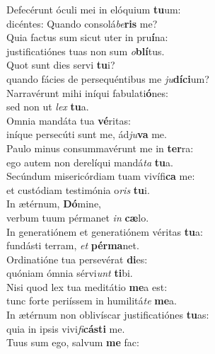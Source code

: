 \evenverse Defecérunt óculi mei in elóquium \textbf{tu}um:~\*\\
\evenverse dicéntes: Quando consolá\textit{be}\textbf{ris} me?\\
\oddverse Quia factus sum sicut uter in pru\textbf{í}na:~\*\\
\oddverse justificatiónes tuas non sum \textit{o}\textbf{blí}tus.\\
\evenverse Quot sunt dies servi \textbf{tu}i?~\*\\
\evenverse quando fácies de persequéntibus me \textit{ju}\textbf{dí}\textbf{ci}um?\\
\oddverse Narravérunt mihi iníqui fabulati\textbf{ó}nes:~\*\\
\oddverse sed non ut \textit{lex} \textbf{tu}a.\\
\evenverse Omnia mandáta tua \textbf{vé}ritas:~\*\\
\evenverse iníque persecúti sunt me, ád\textit{ju}\textbf{va} me.\\
\oddverse Paulo minus consummavérunt me in \textbf{ter}ra:~\*\\
\oddverse ego autem non derelíqui mandá\textit{ta} \textbf{tu}a.\\
\evenverse Secúndum misericórdiam tuam vivífi\textbf{ca} me:~\*\\
\evenverse et custódiam testimónia o\textit{ris} \textbf{tu}i.\\
\oddverse In ætérnum, \textbf{Dó}mine,~\*\\
\oddverse verbum tuum pérmanet \textit{in} \textbf{cæ}lo.\\
\evenverse In generatiónem et generatiónem véritas \textbf{tu}a:~\*\\
\evenverse fundásti terram, \textit{et} \textbf{pér}\textbf{ma}net.\\
\oddverse Ordinatióne tua persevérat \textbf{di}es:~\*\\
\oddverse quóniam ómnia sérvi\textit{unt} \textbf{ti}bi.\\
\evenverse Nisi quod lex tua meditátio \textbf{me}a est:~\*\\
\evenverse tunc forte periíssem in humilitá\textit{te} \textbf{me}a.\\
\oddverse In ætérnum non oblivíscar justificatiónes \textbf{tu}as:~\*\\
\oddverse quia in ipsis vivi\textit{fi}\textbf{cá}\textbf{sti} me.\\
\evenverse Tuus sum ego, salvum \textbf{me} fac:~\*\\
